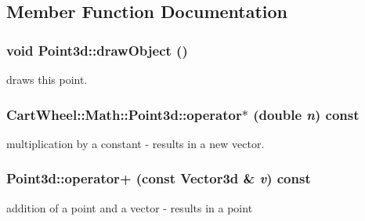 \subsection{Member Function Documentation}
\hypertarget{classCartWheel_1_1Math_1_1Point3d_ad4784634835bd008130e762549635a6e}{
\subsubsection[{drawObject}]{\setlength{\rightskip}{0pt plus 5cm}void Point3d::drawObject ()}}
\label{classCartWheel_1_1Math_1_1Point3d_ad4784634835bd008130e762549635a6e}
draws this point. \hypertarget{classCartWheel_1_1Math_1_1Point3d_a4c46bd5ab3db7e6566abb5b9495d40d5}{
\subsubsection[{operator$\ast$}]{ CartWheel::Math::Point3d::operator$\ast$ (double {\em n}) const}}
\label{classCartWheel_1_1Math_1_1Point3d_a4c46bd5ab3db7e6566abb5b9495d40d5}
multiplication by a constant -\/ results in a new vector. \hypertarget{classCartWheel_1_1Math_1_1Point3d_aa72d158cf8d6f11c5646d6c79f8256b9}{
\subsubsection[{operator+}]{ Point3d::operator+ (const {\bf Vector3d} \& {\em v}) const}}
\label{classCartWheel_1_1Math_1_1Point3d_aa72d158cf8d6f11c5646d6c79f8256b9}
addition of a point and a vector -\/ results in a point

